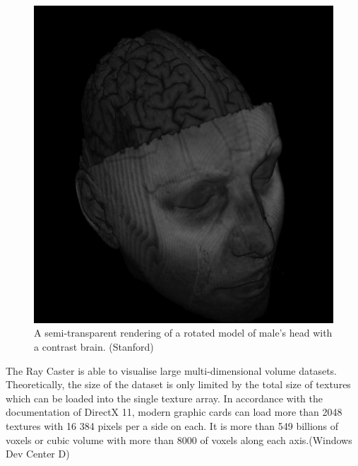 \documentclass[twoside, english, 11pt]{report}
\begin{document}
\begin{figure}[H]
\centerline{\includegraphics[scale = 0.55]{img/brain}}
\caption{A semi-transparent rendering of a rotated model of male's head with a contrast brain. (Stanford)\label{fig:brain}}
\end{figure}

The Ray Caster is able to visualise large multi-dimensional volume datasets. Theoretically, the size of the dataset is only limited by the total size of textures which can be loaded into the single texture array. In accordance with the documentation of DirectX 11, modern graphic cards can load more than 2048 textures with 16 384 pixels per a side on each. It is more than 549 billions of voxels or cubic volume with more than 8000 of voxels along each axis.(Windows Dev Center D)\\
\end{document}

